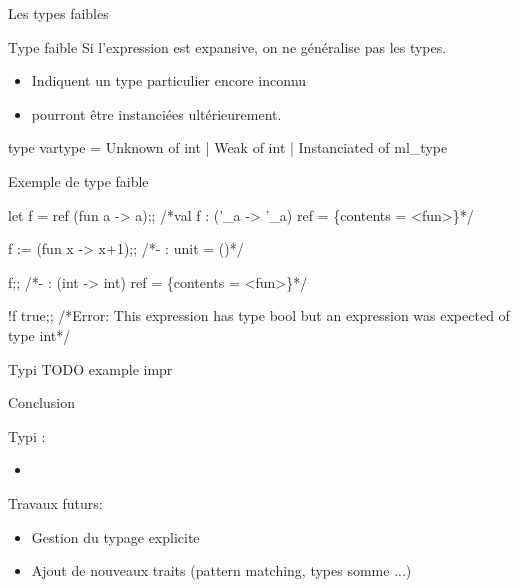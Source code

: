 \documentclass[xcolor={table,dvipsnames}]{beamer}
\begin{document}
\begin{frame}[fragile]{Les types faibles}

\begin{block}{Type faible}
Si l'expression est expansive, on ne généralise pas les types.
\end{block} 
\begin{itemize}
\item Indiquent un type particulier encore inconnu
\item pourront être instanciées ultérieurement.
\end{itemize}


\begin{OCamlEx}
type vartype = 
  Unknown of int
| Weak of int
| Instanciated of ml_type
\end{OCamlEx}

\end{frame}

\begin{frame}[fragile]{Exemple de type faible}
\begin{OCamlEx}
let f = ref (fun a -> a);;
/*val f : ('\_a -> '\_a) ref = \{contents = <fun>\}*/
\end{OCamlEx}
\pause
\begin{OCamlEx}
f := (fun x -> x+1);;
/*- : unit = ()*/
\end{OCamlEx}
\pause
\begin{OCamlEx}
f;;
/*- : (int -> int) ref = \{contents = <fun>\}*/
\end{OCamlEx}
\pause
\begin{OCamlEx}
!f true;;
/*Error: This expression has type bool but an expression was expected of type int*/
\end{OCamlEx}
\end{frame}

\begin{frame}{Typi}
TODO example impr
\end{frame}


\begin{frame}{Conclusion}

Typi :
\begin{itemize}
\item 
\end{itemize}

Travaux futurs:
\begin{itemize}
\item Gestion du typage explicite

\item Ajout de nouveaux traits (pattern matching, types somme ...)
\end{itemize}

\end{frame}
\end{document}
